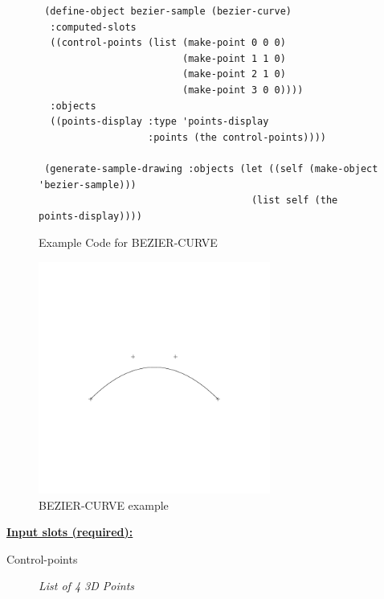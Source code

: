 \documentclass [11pt]{book}
\begin{document}
\begin{itemize}
\begin{figure}
\begin{lrbox}{\boxedverb}
\begin{minipage}{\linewidth}
{\begin{verbatim}
 (define-object bezier-sample (bezier-curve)
  :computed-slots
  ((control-points (list (make-point 0 0 0)
                         (make-point 1 1 0)
                         (make-point 2 1 0)
                         (make-point 3 0 0))))
  :objects
  ((points-display :type 'points-display
                   :points (the control-points))))

 (generate-sample-drawing :objects (let ((self (make-object 'bezier-sample)))
                                     (list self (the points-display))))

\end{verbatim}}
\end{minipage}
\end{lrbox}
\fbox{\usebox{\boxedverb}}

\caption{Example Code for BEZIER-CURVE}

\label{fig:example-code-BEZIER-CURVE}

\end{figure}

\begin{figure}
\begin{center}
\includegraphics[width=3in,height=3in]{../images/example-bezier-curve.pdf}
\end{center}

\caption{BEZIER-CURVE example}

\label{fig:BEZIER-CURVE}

\end{figure}





\textbf{
\underline{Input slots (required):}}

\begin{description}

\item [Control-points]
\emph{List of 4 3D Points}


\end{description}
\end{itemize}
\end{document}
